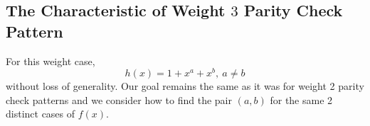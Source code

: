 

\subsection{The Characteristic of Weight $3$ Parity Check Pattern}
For this weight case, 
\begin{equation}
h(x)=1+x^a+x^b,~a\neq b
\label{novelEqwt3}
\end{equation}
without loss of generality. Our goal remains the same as it was for weight 2 parity check patterns and we consider how to find the pair $(a,b)$ for the same 2 distinct cases of $f(x)$.
